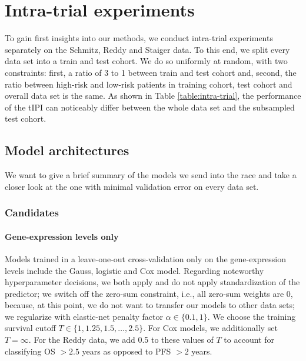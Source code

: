 \section{Intra-trial experiments}\label{sec:intra-trial}

To gain first insights into our methods, we conduct intra-trial experiments separately on the 
Schmitz, Reddy and Staiger data. To this end, we split every data set into a train and test 
cohort. We do so uniformly at random, with two constraints: first, a ratio of 3 to 1 between train 
and test cohort and, second, the ratio between high-risk and low-risk patients in training cohort, 
test cohort and overall data set is the same. As shown in Table \ref{table:intra-trial}, the 
performance of the tIPI can noticeably differ between the whole data set and the subsampled test cohort. 



\subsection{Model architectures}

We want to give a brief summary of the models we send into the race and take a closer look at the 
one with minimal validation error on every data set.

\subsubsection{Candidates}

\paragraph{Gene-expression levels only}
Models trained in a leave-one-out cross-validation only on the gene-expression levels include the 
Gauss, logistic and Cox model. Regarding noteworthy hyperparameter decisions, we both apply and 
do not apply standardization of the predictor; we switch off the zero-sum constraint, i.e., all 
zero-sum weights are \num{0},
because, at this point, we do not want to transfer our models to other data sets;
we regularize with elastic-net penalty factor $\alpha \in \{ \num{0.1}, 1 \}$. We choose the 
training survival cutoff $T \in \{ 1, \num{1.25}, \num{1.5}, \ldots, \num{2.5}\}$. For Cox models, 
we additionally set $T = \infty$. For the Reddy data, we add \num{0.5} to these values of $T$ to 
account for classifying OS $> \num{2.5}$ years as opposed to PFS $> \num{2}$ years.

